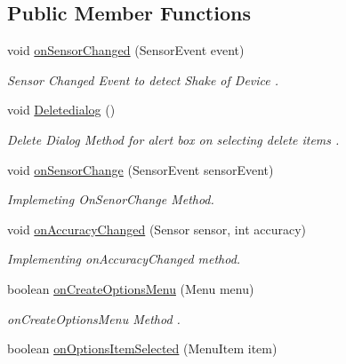 \subsection*{Public Member Functions}
\begin{DoxyCompactItemize}
\item 
void \hyperlink{classcom_1_1example_1_1santh_1_1shoppinglist_1_1_main_activity_ac2cdba2d0e75f10c575a579cb0e7e005}{on\+Sensor\+Changed} (Sensor\+Event event)
\begin{DoxyCompactList}\small\item\em Sensor Changed Event to detect Shake of Device . \end{DoxyCompactList}\item 
void \hyperlink{classcom_1_1example_1_1santh_1_1shoppinglist_1_1_main_activity_af24b73687196d9692cda3ec5b9b940b0}{Deletedialog} ()
\begin{DoxyCompactList}\small\item\em Delete Dialog Method for alert box on selecting delete items . \end{DoxyCompactList}\item 
void \hyperlink{classcom_1_1example_1_1santh_1_1shoppinglist_1_1_main_activity_a54421986b1afd82932b0b720bf778e92}{on\+Sensor\+Change} (Sensor\+Event sensor\+Event)
\begin{DoxyCompactList}\small\item\em Implemeting On\+Senor\+Change Method. \end{DoxyCompactList}\item 
void \hyperlink{classcom_1_1example_1_1santh_1_1shoppinglist_1_1_main_activity_a0a919010e14597e55aa8a9e1eb10c623}{on\+Accuracy\+Changed} (Sensor sensor, int accuracy)
\begin{DoxyCompactList}\small\item\em Implementing on\+Accuracy\+Changed method. \end{DoxyCompactList}\item 
boolean \hyperlink{classcom_1_1example_1_1santh_1_1shoppinglist_1_1_main_activity_a27caba662607287a937803ef6f661a1c}{on\+Create\+Options\+Menu} (Menu menu)
\begin{DoxyCompactList}\small\item\em on\+Create\+Options\+Menu Method . \end{DoxyCompactList}\item 
boolean \hyperlink{classcom_1_1example_1_1santh_1_1shoppinglist_1_1_main_activity_a2b96a266ac60b90e48b09d7dc5c7c7a6}{on\+Options\+Item\+Selected} (Menu\+Item item)

\end{DoxyCompactItemize}
